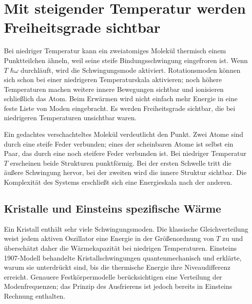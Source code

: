 \section{Mit steigender Temperatur werden Freiheitsgrade sichtbar}

Bei niedriger Temperatur kann ein zweiatomiges Molekül thermisch einem Punktteilchen ähneln, weil seine steife Bindungsschwingung eingefroren ist. Wenn \(T\) \(\hbar\omega\) durchläuft, wird die Schwingungsmode aktiviert. Rotationsmoden können sich schon bei einer niedrigeren Temperaturskala aktivieren; noch höhere Temperaturen machen weitere innere Bewegungen sichtbar und ionisieren schließlich das Atom. Beim Erwärmen wird nicht einfach mehr Energie in eine feste Liste von Moden eingebracht. Es werden Freiheitsgrade sichtbar, die bei niedrigeren Temperaturen unsichtbar waren.

Ein gedachtes verschachteltes Molekül verdeutlicht den Punkt. Zwei Atome sind durch eine steife Feder verbunden; eines der scheinbaren Atome ist selbst ein Paar, das durch eine noch steifere Feder verbunden ist. Bei niedriger Temperatur \(T\) erscheinen beide Strukturen punktförmig. Bei der ersten Schwelle tritt die äußere Schwingung hervor, bei der zweiten wird die innere Struktur sichtbar. Die Komplexität des Systems erschließt sich eine Energieskala nach der anderen.

\begin{classroomqa}
\end{classroomqa}

\subsection{Kristalle und Einsteins spezifische Wärme}

Ein Kristall enthält sehr viele Schwingungsmoden. Die klassische Gleichverteilung weist jedem aktiven Oszillator eine Energie in der Größenordnung von \(T\) zu und überschätzt daher die Wärmekapazität bei niedrigen Temperaturen. Einsteins 1907-Modell behandelte Kristallschwingungen quantenmechanisch und erklärte, warum sie unterdrückt sind, bis die thermische Energie ihre Niveaudifferenz erreicht. Genauere Festkörpermodelle berücksichtigen eine Verteilung der Modenfrequenzen; das Prinzip des Ausfrierens ist jedoch bereits in Einsteins Rechnung enthalten.

